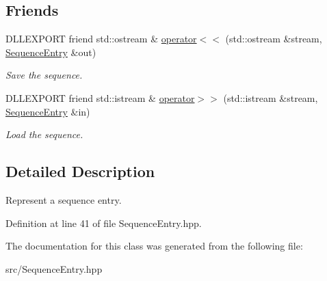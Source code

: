 \subsection*{Friends}
\begin{DoxyCompactItemize}
\item 
\mbox{\label{classtops_1_1SequenceEntry_a5e4a9b581eb798b02fdb5fe49808b25c}} 
D\+L\+L\+E\+X\+P\+O\+RT friend std\+::ostream \& \hyperlink{classtops_1_1SequenceEntry_a5e4a9b581eb798b02fdb5fe49808b25c}{operator$<$$<$} (std\+::ostream \&stream, \hyperlink{classtops_1_1SequenceEntry}{Sequence\+Entry} \&out)
\begin{DoxyCompactList}\small\item\em Save the sequence. \end{DoxyCompactList}\item 
\mbox{\label{classtops_1_1SequenceEntry_ac5abee2d78fdb647906d44854b904182}} 
D\+L\+L\+E\+X\+P\+O\+RT friend std\+::istream \& \hyperlink{classtops_1_1SequenceEntry_ac5abee2d78fdb647906d44854b904182}{operator$>$$>$} (std\+::istream \&stream, \hyperlink{classtops_1_1SequenceEntry}{Sequence\+Entry} \&in)
\begin{DoxyCompactList}\small\item\em Load the sequence. \end{DoxyCompactList}\end{DoxyCompactItemize}


\subsection{Detailed Description}
Represent a sequence entry. 

Definition at line 41 of file Sequence\+Entry.\+hpp.



The documentation for this class was generated from the following file\+:\begin{DoxyCompactItemize}
\item 
src/Sequence\+Entry.\+hpp\end{DoxyCompactItemize}

